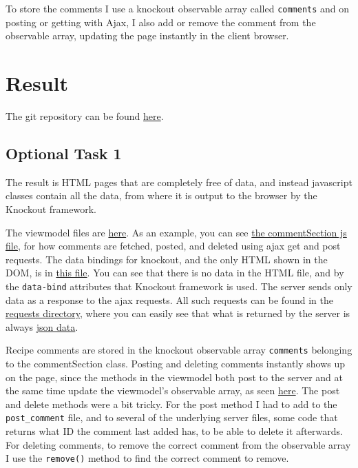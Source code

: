 \documentclass[a4paper]{scrreprt}
\newcommand{\code}[1]{\texttt{#1}}
\begin{document}
To store the comments I use a knockout observable array called \code{comments} and on posting or getting with Ajax, I also add or remove the comment from the observable array, updating the page instantly in the client browser.

\chapter{Result}
\label{sec:result}

The git repository can be found \href{https://github.com/fongie/TastyRecipes/tree/assignment4}{here}.

\section{Optional Task 1}

The result is HTML pages that are completely free of data, and instead javascript classes contain all the data, from where it is output to the browser by the Knockout framework.

The viewmodel files are \href{https://github.com/fongie/TastyRecipes/tree/assignment4/src/view/viewmodel}{here}. As an example, you can see \href{https://github.com/fongie/TastyRecipes/tree/assignment4/src/view/viewmodel/commentSection}{the commentSection js file}, for how comments are fetched, posted, and deleted using ajax get and post requests. The data bindings for knockout, and the only HTML shown in the DOM, is in \href{https://github.com/fongie/TastyRecipes/tree/assignment4/src/view/parts/comments.php}{this file}. You can see that there is no data in the HTML file, and by the \code{data-bind} attributes that Knockout framework is used. The server sends only data as a response to the ajax requests. All such requests can be found in the \href{https://github.com/fongie/TastyRecipes/tree/assignment4/src/view/requests}{requests directory}, where you can easily see that what is returned by the server is always \href{https://github.com/fongie/TastyRecipes/blob/b3511142454b98a722c9f1fa76f3680c740ec1b4/src/view/requests/get\_comments.php#L8}{json data}.

Recipe comments are stored in the knockout observable array \code{comments} belonging to the {commentSection} class. Posting and deleting comments instantly shows up on the page, since the methods in the viewmodel both post to the server and at the same time update the viewmodel's observable array, as seen \href{https://github.com/fongie/TastyRecipes/blob/d5a045f5de354d46aa2ed07f5e2d84885910bad4/src/view/viewmodel/commentSection.js#L45}{here}. The post and delete methods were a bit tricky. For the post method I had to add to the \code{post\_comment} file, and to several of the underlying server files, some code that returns what ID the comment last added has, to be able to delete it afterwards. For deleting comments, to remove the correct comment from the observable array I use the \code{remove()} method to find the correct comment to remove.
\end{document}
